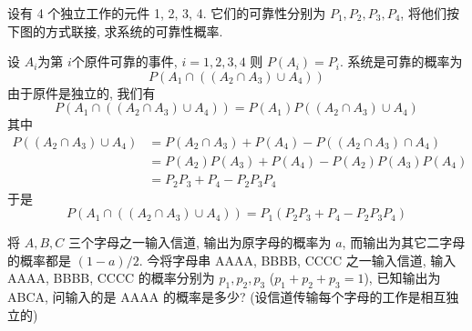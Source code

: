 \documentclass[../main.tex]{subfiles}
\begin{document}
\begin{exercise}{}{}
设有 4 个独立工作的元件 1, 2, 3, 4. 它们的可靠性分别为 $P_1, P_2, P_3, P_4$, 将他们按下图的方式联接, 求系统的可靠性概率.
\begin{center}
\end{center}
\end{exercise}

\begin{solution}
    设 \(  A_{i}  \)为第 \(  i  \)个原件可靠的事件, \(  i= 1,2,3,4  \)  则 \(P\left( A_{i} \right)= P_{i}    \).   系统是可靠的概率为 \[
    P\left( A_1\cap \left( \left( A_2\cap A_3 \right)\cup A_4  \right)  \right) 
    \]由于原件是独立的, 我们有 \[
    P\left( A_1\cap \left( \left( A_2\cap A_3 \right)\cup A_4  \right)  \right)= P\left( A_1 \right)  P\left( \left( A_2\cap A_3 \right)\cup A_4  \right) 
    \]其中 \[
   \begin{aligned}
    P\left( \left( A_2\cap A_3 \right)\cup A_4  \right)&= P\left( A_2\cap A_3 \right)+ P\left( A_4 \right)-P\left( \left( A_2\cap A_3 \right)\cap A_4  \right)     \\ 
     &= P\left( A_2 \right)P\left( A_3 \right)+ P\left( A_4 \right)-P\left( A_2 \right)P\left( A_3 \right)P\left( A_4 \right)\\ 
      &= P_2P_3+ P_4-P_2P_3P_4      
   \end{aligned}
    \]于是 \[
    P\left( A_1\cap \left( \left( A_2\cap A_3 \right)\cup A_4  \right)  \right)= P_1\left( P_2P_3+ P_4-P_2P_3P_4 \right)  
    \]
\end{solution}

\begin{exercise}{}{}
将 $A, B, C$ 三个字母之一输入信道, 输出为原字母的概率为 $a$, 而输出为其它二字母的概率都是 $(1-a)/2$. 今将字母串 AAAA, BBBB, CCCC 之一输入信道, 输入 AAAA, BBBB, CCCC 的概率分别为 $p_1, p_2, p_3$ ($p_1 + p_2 + p_3 = 1$), 已知输出为 ABCA, 问输入的是 AAAA 的概率是多少? (设信道传输每个字母的工作是相互独立的)
\end{exercise}
\end{document}
